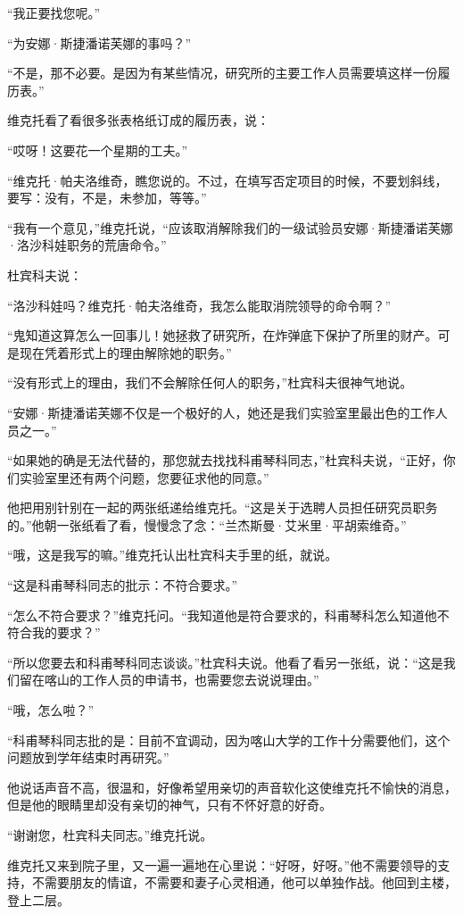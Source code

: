 “我正要找您呢。”

“为安娜·斯捷潘诺芙娜的事吗？”

“不是，那不必要。是因为有某些情况，研究所的主要工作人员需要填这样一份履历表。”

维克托看了看很多张表格纸订成的履历表，说：

“哎呀！这要花一个星期的工夫。”

“维克托·帕夫洛维奇，瞧您说的。不过，在填写否定项目的时候，不要划斜线，要写：没有，不是，未参加，等等。”

“我有一个意见，”维克托说，“应该取消解除我们的一级试验员安娜·斯捷潘诺芙娜·洛沙科娃职务的荒唐命令。”

杜宾科夫说：

“洛沙科娃吗？维克托·帕夫洛维奇，我怎么能取消院领导的命令啊？”

“鬼知道这算怎么一回事儿！她拯救了研究所，在炸弹底下保护了所里的财产。可是现在凭着形式上的理由解除她的职务。”

“没有形式上的理由，我们不会解除任何人的职务，”杜宾科夫很神气地说。

“安娜·斯捷潘诺芙娜不仅是一个极好的人，她还是我们实验室里最出色的工作人员之一。”

“如果她的确是无法代替的，那您就去找找科甫琴科同志，”杜宾科夫说，“正好，你们实验室里还有两个问题，您要征求他的同意。”

他把用别针别在一起的两张纸递给维克托。“这是关于选聘人员担任研究员职务的。”他朝一张纸看了看，慢慢念了念：“兰杰斯曼·艾米里·平胡索维奇。”

“哦，这是我写的嘛。”维克托认出杜宾科夫手里的纸，就说。

“这是科甫琴科同志的批示：不符合要求。”

“怎么不符合要求？”维克托问。“我知道他是符合要求的，科甫琴科怎么知道他不符合我的要求？”

“所以您要去和科甫琴科同志谈谈。”杜宾科夫说。他看了看另一张纸，说：“这是我们留在喀山的工作人员的申请书，也需要您去说说理由。”

“哦，怎么啦？”

“科甫琴科同志批的是：目前不宜调动，因为喀山大学的工作十分需要他们，这个问题放到学年结束时再研究。”

他说话声音不高，很温和，好像希望用亲切的声音软化这使维克托不愉快的消息，但是他的眼睛里却没有亲切的神气，只有不怀好意的好奇。

“谢谢您，杜宾科夫同志。”维克托说。

维克托又来到院子里，又一遍一遍地在心里说：“好呀，好呀。”他不需要领导的支持，不需要朋友的情谊，不需要和妻子心灵相通，他可以单独作战。他回到主楼，登上二层。

